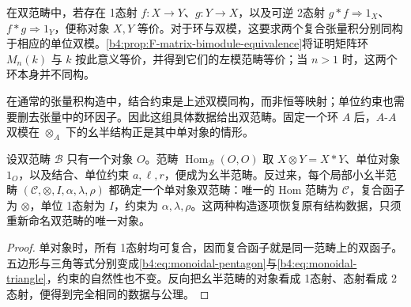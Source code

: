 在双范畴中，若存在 1态射 \(f:X\rightarrow Y\)、\(g:Y\rightarrow X\)，以及可逆 2态射 \(g*f\Rightarrow1_X\)、\(f*g\Rightarrow1_Y\)，便称对象 \(X,Y\) 等价。对于环与双模，这要求两个复合张量积分别同构于相应的单位双模。\cref{b4:prop:F-matrix-bimodule-equivalence}将证明矩阵环 \(M_n(k)\) 与 \(k\) 按此意义等价，并得到它们的左模范畴等价；当 \(n>1\) 时，这两个环本身并不同构。

\ProseParagraphBreak

在通常的张量积构造中，结合约束是上述双模同构，而非恒等映射；单位约束也需要删去张量中的环因子。因此这组具体数据给出双范畴。固定一个环 \(A\) 后，\(A\)-\(A\) 双模在 \(\otimes_A\) 下的幺半结构正是其中单对象的情形。

\begin{proposition}\label{b4:prop:F-one-object-bicategory}
	设双范畴 \(\mathcal B\) 只有一个对象 \(O\)。范畴 \(\operatorname{Hom}_{\mathcal B}(O,O)\) 取 \(X\otimes Y=X*Y\)、单位对象 \(1_O\)，以及结合、单位约束 \(a,\ell,r\)，便成为幺半范畴。反过来，每个局部小幺半范畴 \((\mathcal C,\otimes,I,\alpha,\lambda,\rho)\) 都确定一个单对象双范畴：唯一的 Hom 范畴为 \(\mathcal C\)，复合函子为 \(\otimes\)，单位 1态射为 \(I\)，约束为 \(\alpha,\lambda,\rho\)。这两种构造逐项恢复原有结构数据，只须重新命名双范畴的唯一对象。
\end{proposition}
\begin{proof}
	单对象时，所有 1态射均可复合，因而复合函子就是同一范畴上的双函子。五边形与三角等式分别变成\eqref{b4:eq:monoidal-pentagon}与\eqref{b4:eq:monoidal-triangle}，约束的自然性也不变。反向把幺半范畴的对象看成 1态射、态射看成 2态射，便得到完全相同的数据与公理。
\end{proof}

